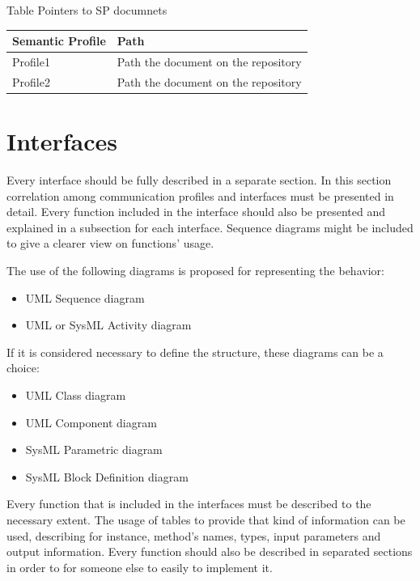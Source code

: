 \documentclass{article}
\newcounter{Table}
\renewcommand\theTable{\arabic{Table}}
\begin{document}
Table \stepcounter{Table}{\theTable} Pointers to SP documnets

\begin{flushleft}
\tablefirsthead{}
\tablehead{}
\tabletail{}
\tablelasttail{}
\begin{supertabular}{|m{1.8393599in}|m{4.09346in}|}
\hline
Semantic Profile &
Path\\\hline
Profile1 &
Path the document on the repository\\\hline
Profile2 &
Path the document on the repository\\\hline
\end{supertabular}
\end{flushleft}


\section[Interfaces]{Interfaces}
Every interface should be fully described in a separate section. In this section correlation among communication profiles and interfaces must be presented in detail. Every function included in the interface should also be presented and explained in a subsection for each interface. Sequence diagrams might be included to give a clearer view on functions' usage. 

The use of the following diagrams is proposed for representing the behavior:

\begin{itemize}
\item UML Sequence diagram
\item UML or SysML Activity diagram
\end{itemize}
If it is considered necessary to define the structure, these diagrams can be a choice:

\begin{itemize}
\item UML Class diagram
\item UML Component diagram
\item SysML Parametric diagram
\item SysML Block Definition diagram
\end{itemize}
Every function that is included in the interfaces must be described to the necessary extent. The usage of tables to provide that kind of information can be used, describing for instance, method's names, types, input parameters and output information. Every function should also be described in separated sections in order to for someone else to easily to implement it.  
\end{document}

